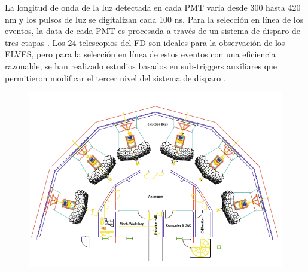 \documentclass[12pt,oneside,openany,letter]{book}
\begin{document}
La longitud de onda de la luz detectada en cada PMT varia desde 300 hasta 420 nm y los pulsos de luz se digitalizan cada 100 ns. Para la selección en línea de los eventos, la data de cada PMT es procesada a través de un sistema de disparo de tres etapas \cite{MussaCiaccio2012}. Los 24 telescopios del FD son ideales para la observación de los ELVES, pero para la selecci\'on en línea de estos eventos con una eficiencia razonable, se han realizado estudios basados en sub-triggers auxiliares que permitieron modificar el tercer nivel del sistema de disparo \cite{Mussa2019}.

\begin{figure}
    \centering
    \includegraphics[scale=0.5]{figures/eye_scheme.png}
    

\end{figure}
\end{document}
